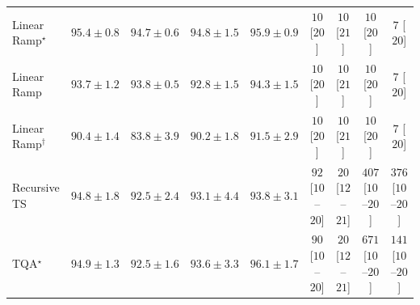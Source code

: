 \begin{tabular}{l|cccc|cccc|}
Linear Ramp$^\star$ & {\cellcolor[HTML]{034973}} \color[HTML]{F1F1F1} $95.4\pm 0.8$ & {\cellcolor[HTML]{034D79}} \color[HTML]{F1F1F1} $94.7\pm 0.6$ & {\cellcolor[HTML]{034D79}} \color[HTML]{F1F1F1} $94.8\pm 1.5$ & {\cellcolor[HTML]{03466E}} \color[HTML]{F1F1F1} $95.9\pm 0.9$ & {\cellcolor[HTML]{FFF6F2}} \color[HTML]{000000} $10$ [$20$] & {\cellcolor[HTML]{FFF6F2}} \color[HTML]{000000} $10$ [$21$] & {\cellcolor[HTML]{FFF6F2}} \color[HTML]{000000} $10$ [$20$] & {\cellcolor[HTML]{FFF6F2}} \color[HTML]{000000} $7$ [$20$] \\
Linear Ramp & {\cellcolor[HTML]{045483}} \color[HTML]{F1F1F1} $93.7\pm 1.2$ & {\cellcolor[HTML]{045382}} \color[HTML]{F1F1F1} $93.8\pm 0.5$ & {\cellcolor[HTML]{04598C}} \color[HTML]{F1F1F1} $92.8\pm 1.5$ & {\cellcolor[HTML]{034F7D}} \color[HTML]{F1F1F1} $94.3\pm 1.5$ & {\cellcolor[HTML]{FFF6F2}} \color[HTML]{000000} $10$ [$20$] & {\cellcolor[HTML]{FFF6F2}} \color[HTML]{000000} $10$ [$21$] & {\cellcolor[HTML]{FFF6F2}} \color[HTML]{000000} $10$ [$20$] & {\cellcolor[HTML]{FFF6F2}} \color[HTML]{000000} $7$ [$20$] \\
Linear Ramp$^\dagger$ & {\cellcolor[HTML]{04629A}} \color[HTML]{F1F1F1} $90.4\pm 1.4$ & {\cellcolor[HTML]{2081B9}} \color[HTML]{F1F1F1} $83.8\pm 3.9$ & {\cellcolor[HTML]{04639B}} \color[HTML]{F1F1F1} $90.2\pm 1.8$ & {\cellcolor[HTML]{045E94}} \color[HTML]{F1F1F1} $91.5\pm 2.9$ & {\cellcolor[HTML]{FFF6F2}} \color[HTML]{000000} $10$ [$20$] & {\cellcolor[HTML]{FFF6F2}} \color[HTML]{000000} $10$ [$21$] & {\cellcolor[HTML]{FFF6F2}} \color[HTML]{000000} $10$ [$20$] & {\cellcolor[HTML]{FFF6F2}} \color[HTML]{000000} $7$ [$20$] \\
Recursive TS & {\cellcolor[HTML]{034D79}} \color[HTML]{F1F1F1} $94.8\pm 1.8$ & {\cellcolor[HTML]{045A8D}} \color[HTML]{F1F1F1} $92.5\pm 2.4$ & {\cellcolor[HTML]{045788}} \color[HTML]{F1F1F1} $93.1\pm 4.4$ & {\cellcolor[HTML]{045382}} \color[HTML]{F1F1F1} $93.8\pm 3.1$ & {\cellcolor[HTML]{FDE1DE}} \color[HTML]{000000} $92$ [$10$--$20$] & {\cellcolor[HTML]{FFF3EF}} \color[HTML]{000000} $20$ [$12$--$21$] & {\cellcolor[HTML]{F35F9F}} \color[HTML]{F1F1F1} $407$ [$10$--$20$] & {\cellcolor[HTML]{F770A4}} \color[HTML]{F1F1F1} $376$ [$10$--$20$] \\
TQA$^\star$ & {\cellcolor[HTML]{034C78}} \color[HTML]{F1F1F1} $94.9\pm 1.3$ & {\cellcolor[HTML]{045A8D}} \color[HTML]{F1F1F1} $92.5\pm 1.6$ & {\cellcolor[HTML]{045483}} \color[HTML]{F1F1F1} $93.6\pm 3.3$ & {\cellcolor[HTML]{03456C}} \color[HTML]{F1F1F1} $96.1\pm 1.7$ & {\cellcolor[HTML]{FDE2DF}} \color[HTML]{000000} $90$ [$10$--$20$] & {\cellcolor[HTML]{FFF3EF}} \color[HTML]{000000} $20$ [$12$--$21$] & {\cellcolor[HTML]{7D0177}} \color[HTML]{F1F1F1} $671$ [$10$--$20$] & {\cellcolor[HTML]{FDD4D0}} \color[HTML]{000000} $141$ [$10$--$20$] \\

\end{tabular}
